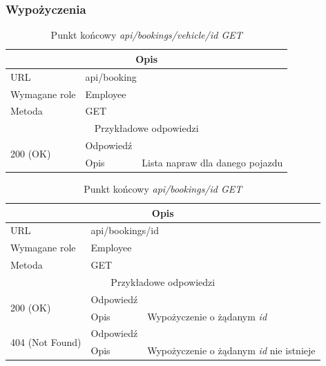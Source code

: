 \documentclass[eng,printmode,openany]{mgr}
\begin{document}
	\subsubsection{Wypożyczenia}
	\begin{table}[H]
		\caption{Punkt końcowy \textit{api/bookings/vehicle/id GET}}
		\begin{tabularx}{\textwidth}{|l|l|X|}
			\hline
			\multicolumn{3}{|c|}{Opis}                         						\\ \hline
			URL                       & \multicolumn{2}{l|}{api/booking} 	    	\\ \hline
			Wymagane role             & \multicolumn{2}{l|}{Employee}               \\ \hline
			Metoda                    & \multicolumn{2}{l|}{GET} 					\\ \hline
			\multicolumn{3}{|c|}{ Przykładowe odpowiedzi}                   		\\ \hline
			\multirow{2}{*}{200 (OK)} 			& Odpowiedź     &      		\\ \cline{2-3} 
			& Opis         	& Lista napraw dla danego pojazdu		      		                                \\ \hline
		\end{tabularx}
	\end{table}
	
	\begin{table}[H]
		\caption{Punkt końcowy \textit{api/bookings/id GET}}
		\begin{tabularx}{\textwidth}{|l|l|X|}
			\hline
			\multicolumn{3}{|c|}{Opis}                         						\\ \hline
			URL                       & \multicolumn{2}{l|}{api/bookings/id} 	\\ \hline
			Wymagane role             & \multicolumn{2}{l|}{Employee}               \\ \hline
			Metoda                    & \multicolumn{2}{l|}{GET} 					\\ \hline
			\multicolumn{3}{|c|}{ Przykładowe odpowiedzi}                   		\\ \hline
			\multirow{2}{*}{200 (OK)} 			& Odpowiedź    	&       	\\ \cline{2-3} 
			& Opis         	& Wypożyczenie o żądanym \textit{id}      									            \\ \hline
			\multirow{2}{*}{404 (Not Found)} 	& Odpowiedź     &     \\ \cline{2-3} 
			& Opis          & Wypożyczenie o żądanym \textit{id} nie istnieje      								    \\ \hline
		\end{tabularx}
	\end{table}
	
\end{document}
